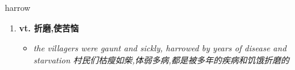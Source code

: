 
\begin{frame}
{\huge harrow}
\begin{center}
\begin{enumerate}\Large
  \item \textbf{vt. 折磨,使苦恼}
  \begin{itemize}
    \item \em{\Large{the villagers were gaunt and sickly, harrowed by years of disease and starvation 村民们枯瘦如柴,体弱多病,都是被多年的疾病和饥饿折磨的}}
  \end{itemize}
\end{enumerate}
\end{center}
\end{frame}
